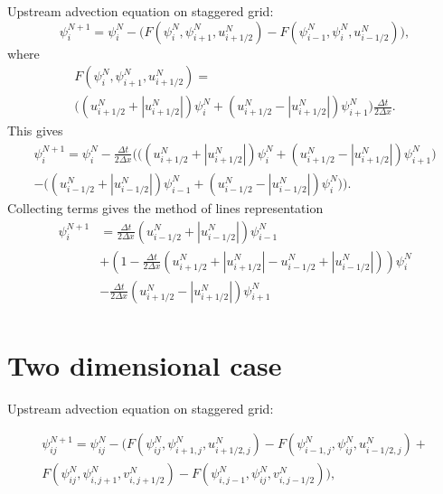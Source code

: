 \documentclass[12pt, a4paper]{article}
\newcommand{\abs}[1]{\left\lvert#1\right\rvert}
\begin{document}
Upstream advection equation on staggered grid:
\begin{equation}
 \psi_i^{N+1} = \psi_i^N - \Big( F \left( \psi_i^N,\psi_{i+1}^N,u_{i+1/2}^N\right)
-F \left( \psi_{i-1}^N,\psi_{i}^N,u_{i-1/2}^N\right) \Big),
\end{equation}
where
\begin{multline}
F \left( \psi_i^N,\psi_{i+1}^N,u_{i+1/2}^N\right) =\\
\Big( \left( u_{i+1/2}^N + \abs{u_{i+1/2}^N} \right) \psi_i^N
+ \left( u_{i+1/2}^N - \abs{u_{i+1/2}^N} \right) \psi_{i+1}^N \Big)
\frac{\Delta t}{2 \Delta x}.
\end{multline}
This gives
\begin{multline}
\psi_i^{N+1} = \psi_i^N - \frac{\Delta t}{2 \Delta x} \bigg( \Big( \left( u_{i+1/2}^N + \abs{u_{i+1/2}^N} \right) \psi_i^N
+ \left( u_{i+1/2}^N - \abs{u_{i+1/2}^N} \right) \psi_{i+1}^N \Big)
\\
- \Big( \left( u_{i-1/2}^N + \abs{u_{i-1/2}^N} \right) \psi_{i-1}^N
+ \left( u_{i-1/2}^N - \abs{u_{i-1/2}^N} \right) \psi_{i}^N \Big) \bigg).
\end{multline}
Collecting terms gives the method of lines representation
\begin{equation}
\begin{split}
\psi_i^{N+1} &=
\frac{\Delta t}{2 \Delta x} \left( u_{i-1/2}^N + \abs{u_{i-1/2}^N} \right) \psi_{i-1}^N\\
&+ \left(1 - \frac{\Delta t}{2 \Delta x} \left( u_{i+1/2}^N + \abs{u_{i+1/2}^N} - u_{i-1/2}^N + \abs{u_{i-1/2}^N} \right) \right) \psi_i^N\\
&-\frac{\Delta t}{2 \Delta x} \left( u_{i+1/2}^N - \abs{u_{i+1/2}^N} \right) \psi_{i+1}^N\\
\end{split}
\end{equation}

\section*{Two dimensional case}
Upstream advection equation on staggered grid:

\begin{multline}
 \psi_{ij}^{N+1} = \psi_{ij}^N - \Big( F \left( \psi_{ij}^N,\psi_{i+1,j}^N,u_{i+1/2,j}^N\right)
-F \left( \psi_{i-1,j}^N,\psi_{ij}^N,u_{i-1/2,j}^N\right) + \\ F \left( \psi_{ij}^N,\psi_{i,j+1}^N,v_{i,j+1/2}^N\right) -F \left( \psi_{i,j-1}^N,\psi_{ij}^N,v_{i,j-1/2}^N\right) \Big),
\end{multline}
\end{document}

